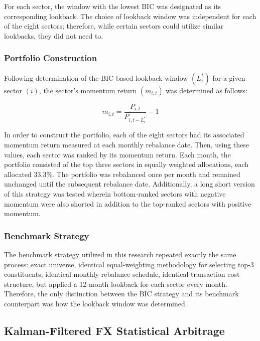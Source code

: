\documentclass[12pt]{article}
\begin{document}
For each sector, the window with the lowest BIC was designated as its corresponding lookback. The choice of lookback window was independent for each of the eight sectors; therefore, while certain sectors could utilize similar lookbacks, they did not need to.

\subsubsection{Portfolio Construction}

Following determination of the BIC-based lookback window $(L_i^{*})$ for a given sector $(i)$, the sector's momentum return $(m_{i,t})$ was determined as follows:

\begin{equation}
m_{i,t} = \frac{P_{i,t}}{P_{i, t-L^*_i}} - 1
\end{equation}

In order to construct the portfolio, each of the eight sectors had its associated momentum return measured at each monthly rebalance date. Then, using these values, each sector was ranked by its momentum return. Each month, the portfolio consisted of the top three sectors in equally weighted allocations, each allocated 33.3\%. The portfolio was rebalanced once per month and remained unchanged until the subsequent rebalance date. Additionally, a long short version of this strategy was tested wherein bottom-ranked sectors with negative momentum were also shorted in addition to the top-ranked sectors with positive momentum.

\subsubsection{Benchmark Strategy}

The benchmark strategy utilized in this research repeated exactly the same process: exact universe, identical equal-weighting methodology for selecting top-3 constituents, identical monthly rebalance schedule, identical transaction cost structure, but applied a 12-month lookback for each sector every month. Therefore, the only distinction between the BIC strategy and its benchmark counterpart was how the lookback window was determined.


\subsection{Kalman-Filtered FX Statistical Arbitrage}
\end{document}
